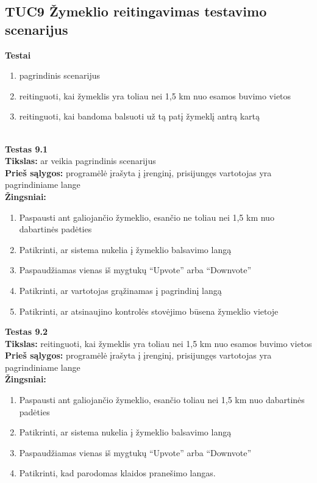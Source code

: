 \documentclass{VUMIFPSkursinis}
\begin{document}
	\subsection{TUC9 Žymeklio reitingavimas testavimo scenarijus}
		\textbf{Testai}
		\begin{enumerate}[noitemsep,topsep=0pt]
			\item pagrindinis scenarijus
			\item reitinguoti, kai žymeklis yra toliau nei 1,5 km nuo esamos buvimo vietos
			\item reitinguoti, kai bandoma balsuoti už tą patį žymeklį antrą kartą
		\end{enumerate}
		\textbf{}\\
		\textbf{Testas 9.1}\\
		\textbf{Tikslas:} ar veikia pagrindinis scenarijus\\
		\textbf{Prieš sąlygos:} programėlė įrašyta į įrenginį, prisijungęs vartotojas yra pagrindiniame lange\\
		\textbf{Žingsniai:}
		\begin{enumerate}[noitemsep,topsep=0pt]
			\item Paspausti ant galiojančio žymeklio, esančio ne toliau nei 1,5 km nuo dabartinės padėties
			\item Patikrinti, ar sistema nukelia į žymeklio balsavimo langą
			\item Paspaudžiamas vienas iš mygtukų “Upvote” arba “Downvote”
			\item Patikrinti, ar vartotojas grąžinamas į pagrindinį langą
			\item Patikrinti, ar atsinaujino kontrolės stovėjimo būsena žymeklio vietoje 
		\end{enumerate}
		\textbf{Testas 9.2}\\
		\textbf{Tikslas:} reitinguoti, kai žymeklis yra toliau nei 1,5 km nuo esamos buvimo vietos\\
		\textbf{Prieš sąlygos:} programėlė įrašyta į įrenginį, prisijungęs vartotojas yra pagrindiniame lange\\
		\textbf{Žingsniai:}
		\begin{enumerate}[noitemsep,topsep=0pt]
			\item Paspausti ant galiojančio žymeklio, esančio toliau nei 1,5 km nuo dabartinės padėties
			\item Patikrinti, ar sistema nukelia į žymeklio balsavimo langą
			\item Paspaudžiamas vienas iš mygtukų “Upvote” arba “Downvote”
			\item Patikrinti, kad parodomas klaidos pranešimo langas.
		\end{enumerate}
\end{document}
